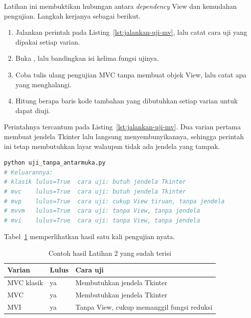Latihan ini membuktikan hubungan antara \textit{dependency} View dan kemudahan
pengujian. Langkah kerjanya sebagai berikut.

\begin{enumerate}
  \item Jalankan perintah pada Listing~\ref{lst:jalankan-uji-mv}, lalu catat cara
    uji yang dipakai setiap varian.
  \item Buka , lalu bandingkan
    isi kelima fungsi ujinya.
  \item Coba tulis ulang pengujian MVC tanpa membuat objek View, lalu catat apa
    yang menghalangi.
  \item Hitung berapa baris kode tambahan yang dibutuhkan setiap varian untuk
    dapat diuji.
\end{enumerate}

Perintahnya tercantum pada Listing~\ref{lst:jalankan-uji-mv}. Dua varian pertama
membuat jendela Tkinter lalu langsung menyembunyikannya, sehingga perintah ini
tetap membutuhkan layar walaupun tidak ada jendela yang tampak.

\begin{lstlisting}[language=bash, caption={Menguji kelima varian, skrip
  tersedia di \berkas{sources/chapter03/uji_tanpa_antarmuka.py}},
  label=lst:jalankan-uji-mv]
python uji_tanpa_antarmuka.py
# Keluarannya:
# klasik lulus=True  cara uji: butuh jendela Tkinter
# mvc    lulus=True  cara uji: butuh jendela Tkinter
# mvp    lulus=True  cara uji: cukup View tiruan, tanpa jendela
# mvvm   lulus=True  cara uji: tanpa View, tanpa jendela
# mvi    lulus=True  cara uji: tanpa View, tanpa jendela
\end{lstlisting}

Tabel~\ref{tab:lat2mv-contoh} memperlihatkan hasil satu kali pengujian nyata.

\begin{table}[htbp]
  \centering
  \caption{Contoh hasil Latihan 2 yang sudah terisi}
  \label{tab:lat2mv-contoh}
  \begin{tabularx}{\textwidth}{|l|l|X|}
    \hline
    \textbf{Varian} & \textbf{Lulus} & \textbf{Cara uji} \\
    \hline
    MVC klasik & ya & Membutuhkan jendela Tkinter \\
    \hline
    MVC & ya & Membutuhkan jendela Tkinter \\
    \hline
    MVI & ya & Tanpa View, cukup memanggil fungsi reduksi \\
    \hline
  \end{tabularx}
\end{table}

